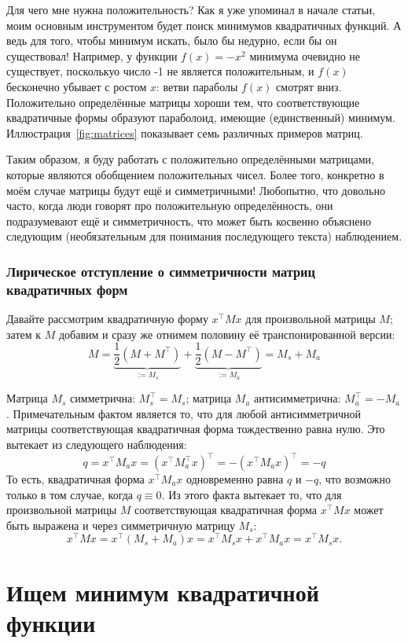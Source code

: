 \documentclass{article}
\begin{document}
Для чего мне нужна положительность? Как я уже упоминал в начале статьи, моим основным инструментом
будет поиск минимумов квадратичных функций. А ведь для того, чтобы минимум искать, было бы недурно, если бы он существовал! Например, у функции $f(x) = - x^2$ минимума очевидно не существует, посколькуо число -1 не является положительным, и $f(x)$ бесконечно убывает с ростом $x$: ветви параболы $f(x)$ смотрят вниз.
Положительно определённые матрицы хороши тем, что соответствующие квадратичные формы образуют параболоид, имеющие (единственный) минимум. Иллюстрация~\ref{fig:matrices} показывает семь различных примеров матриц.

Таким образом, я буду работать с положительно определёнными матрицами, которые являются обобщением положительных чисел. Более того, конкретно в моём случае матрицы будут ещё и симметричными!
Любопытно, что довольно часто, когда люди говорят про положительную определённость, они подразумевают ещё и симметричность, что может быть косвенно объяснено следующим (необязательным для понимания последующего текста) наблюдением.

\subsubsection{Лирическое отступление о симметричности матриц квадратичных форм}

Давайте рассмотрим квадратичную форму $x^\top M x$ для произвольной матрицы $M$; затем
к $M$ добавим и сразу же отнимем половину её транспонированной версии:
$$
M = \underbrace{\frac{1}{2} (M+M^\top)}_{:=M_s} + \underbrace{\frac{1}{2} (M-M^\top)}_{:=M_a} = M_s + M_a
$$

Матрица $M_s$ симметрична: $M_s^\top = M_s$; матрица $M_a$ антисимметрична: $M_a^\top=-M_a$.
Примечательным фактом является то, что для любой антисимметричной матрицы соответствующая квадратичная форма тождественно равна нулю. Это вытекает из следующего наблюдения:
$$
q = x^\top M_a x  = (x^\top M_a^\top x)^\top = - (x^\top M_a x)^\top = -q
$$
То есть, квадратичная форма $x^\top M_a x$ одновременно равна $q$ и $-q$, что возможно только в том случае, когда $q\equiv 0$.
Из этого факта вытекает то, что для произвольной матрицы $M$ соответствующая  квадратичная форма $x^\top M x$ может быть выражена и через симметричную матрицу $M_s$:
$$
x^\top M x = x^\top (M_s + M_a) x = x^\top M_s x  + x^\top M_a x = x^\top M_s x.
$$


\section{Ищем минимум квадратичной функции}
\end{document}
